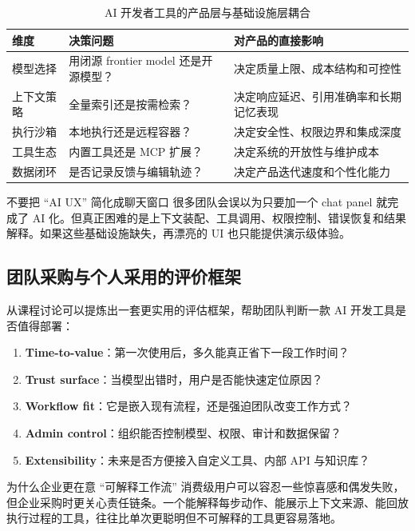 \documentclass[a4paper]{article}
\begin{document}
\begin{table}[H]
\centering
\begin{tabular}{p{} p{} p{}}
\toprule
维度 & 决策问题 & 对产品的直接影响 \\
\midrule
模型选择 & 用闭源 frontier model 还是开源模型？ & 决定质量上限、成本结构和可控性 \\
上下文策略 & 全量索引还是按需检索？ & 决定响应延迟、引用准确率和长期记忆表现 \\
执行沙箱 & 本地执行还是远程容器？ & 决定安全性、权限边界和集成深度 \\
工具生态 & 内置工具还是 MCP 扩展？ & 决定系统的开放性与维护成本 \\
数据闭环 & 是否记录反馈与编辑轨迹？ & 决定产品迭代速度和个性化能力 \\
\bottomrule
\end{tabular}
\caption{AI 开发者工具的产品层与基础设施层耦合}
\end{table}

\begin{warningbox}{不要把 ``AI UX'' 简化成聊天窗口}
很多团队会误以为只要加一个 chat panel 就完成了 AI 化。但真正困难的是上下文装配、工具调用、权限控制、错误恢复和结果解释。如果这些基础设施缺失，再漂亮的 UI 也只能提供演示级体验。
\end{warningbox}

\subsection{团队采购与个人采用的评价框架}

从课程讨论可以提炼出一套更实用的评估框架，帮助团队判断一款 AI 开发工具是否值得部署：

\begin{enumerate}
    \item \textbf{Time-to-value}：第一次使用后，多久能真正省下一段工作时间？
    \item \textbf{Trust surface}：当模型出错时，用户是否能快速定位原因？
    \item \textbf{Workflow fit}：它是嵌入现有流程，还是强迫团队改变工作方式？
    \item \textbf{Admin control}：组织能否控制模型、权限、审计和数据保留？
    \item \textbf{Extensibility}：未来是否方便接入自定义工具、内部 API 与知识库？
\end{enumerate}

\begin{knowledgebox}{为什么企业更在意 ``可解释工作流''}
消费级用户可以容忍一些惊喜感和偶发失败，但企业采购时更关心责任链条。一个能解释每步动作、能展示上下文来源、能回放执行过程的工具，往往比单次更聪明但不可解释的工具更容易落地。
\end{knowledgebox}
\end{document}
